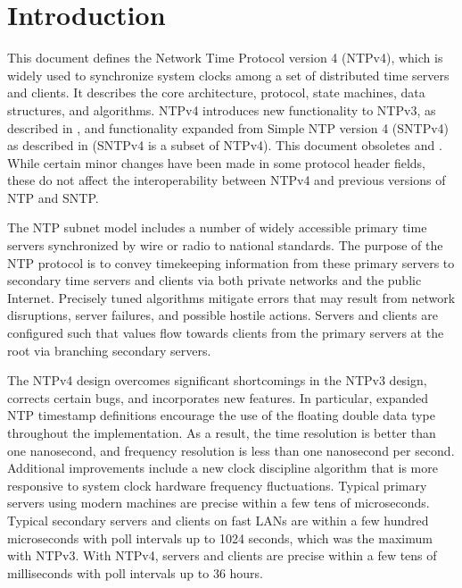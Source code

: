 \chapter{Introduction}
\label{section-1}

This document defines the Network Time Protocol version 4 (NTPv4),
which is widely used to synchronize system clocks among a set of
distributed time servers and clients. It describes the core
architecture, protocol, state machines, data structures, and
algorithms. NTPv4 introduces new functionality to NTPv3, as
described in \cite{RFC1305}, and functionality expanded from Simple NTP
version 4 (SNTPv4) as described in \cite{RFC4330} (SNTPv4 is a subset of
NTPv4). This document obsoletes \cite{RFC1305} and \cite{RFC4330}. While
certain minor changes have been made in some protocol header fields,
these do not affect the interoperability between NTPv4 and previous
versions of NTP and SNTP.

The NTP subnet model includes a number of widely accessible primary
time servers synchronized by wire or radio to national standards.
The purpose of the NTP protocol is to convey timekeeping information
from these primary servers to secondary time servers and clients via
both private networks and the public Internet. Precisely tuned
algorithms mitigate errors that may result from network disruptions,
server failures, and possible hostile actions. Servers and clients
are configured such that values flow towards clients from the primary
servers at the root via branching secondary servers.

The NTPv4 design overcomes significant shortcomings in the NTPv3
design, corrects certain bugs, and incorporates new features. In
particular, expanded NTP timestamp definitions encourage the use of
the floating double data type throughout the implementation. As a
result, the time resolution is better than one nanosecond, and
frequency resolution is less than one nanosecond per second.
Additional improvements include a new clock discipline algorithm that
is more responsive to system clock hardware frequency fluctuations.
Typical primary servers using modern machines are precise within a
few tens of microseconds. Typical secondary servers and clients on
fast LANs are within a few hundred microseconds with poll intervals
up to 1024 seconds, which was the maximum with NTPv3. With NTPv4,
servers and clients are precise within a few tens of milliseconds
with poll intervals up to 36 hours.

